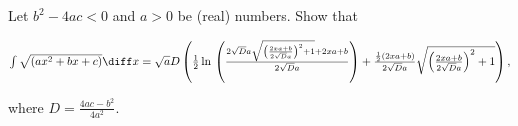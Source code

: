 \label{problemIntegrate sqrt(ax^2+bx+c)dx}
Let $b^2-4ac<0$ and $a>0$ be (real) numbers. Show that 

\noindent $
\int \sqrt{\left(ax^2+bx+c\right)}\diff x = \sqrt{a} D \left(\frac{1}{2} \ln{}\left( \frac{2\sqrt{D} a \sqrt{\left(\frac{2 x a+b}{2 \sqrt{D} a}\right)^{2}+1} +2 x a+b}{2 \sqrt{D} a}\right)+\frac{\frac{1}{2} \left(2 x a+b\right)}{2 \sqrt{D} a} \sqrt{\left(\frac{2 x a+b}{2 \sqrt{D} a}\right)^{2}+1}\right),
$

where 
$\displaystyle D=\frac{4ac-b^2}{4a^2}$.




